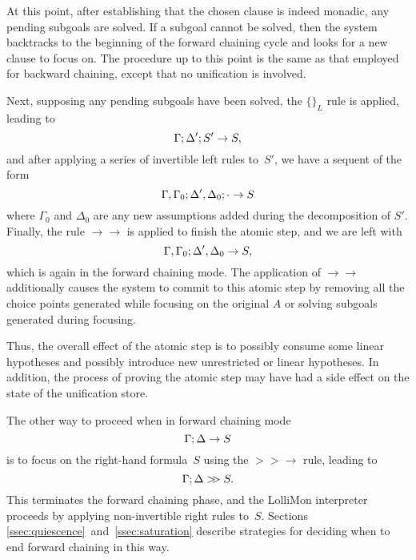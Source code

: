 \documentclass{sig-alt}
\begin{document}
At this point, after establishing that the chosen clause is indeed
monadic, any pending subgoals are solved.  If a
subgoal cannot be solved, then the system backtracks to the beginning
of the forward chaining cycle and looks for a new clause to focus on.
The procedure up to this point is the same as that
employed for backward chaining, except that no unification is involved.

Next, supposing any pending subgoals have been solved, the $\{\}_L$ rule is applied, leading to
$$
  \Gamma;\Delta';S'\rightarrow S,
$$
and after applying a series of invertible left rules to~$S'$, we
have a sequent of the form
$$
  \Gamma,\Gamma_0;\Delta',\Delta_0;\cdot\rightarrow S
$$
%
where $\Gamma_0$ and $\Delta_0$ are any new assumptions added during the
decomposition of $S'$.  Finally, the rule $\rightarrow\rightarrow$ is
applied to finish the atomic step, and we are left with
$$
\Gamma,\Gamma_0;\Delta',\Delta_0\rightarrow S,
$$
%
which is again in the forward chaining mode.  The application of
$\rightarrow\rightarrow$ additionally causes the system to commit to
this atomic step by removing all the choice points generated while
focusing on the original $A$ or solving subgoals generated during focusing.

Thus, the overall effect of the atomic step is to possibly consume some
linear hypotheses and possibly introduce new unrestricted or linear
hypotheses. In addition, the process of proving the atomic step may
have had a side effect on the state of the unification store.

The other way to proceed when in forward chaining mode
$$
  \Gamma;\Delta\rightarrow S
$$
is to focus on the right-hand formula~$S$ using the $>\!\!>\rightarrow$ rule,
leading to
$$
  \Gamma;\Delta\mathrel{>\!\! >}S.
$$ 
%
This terminates the forward chaining phase, and the LolliMon
interpreter proceeds by applying non-invertible right rules to~$S$.
Sections \ref{ssec:quiescence}~and~\ref{ssec:saturation} describe
strategies for
deciding when to end forward chaining in this way.

\end{document}
